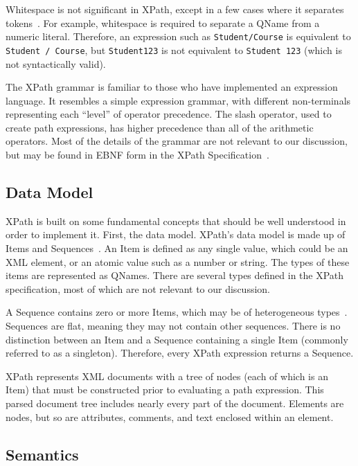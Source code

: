 \documentclass{article}
\begin{document}
Whitespace is not significant in XPath, except in a few cases where it separates
tokens~\cite{xpath}. For example, whitespace is required to separate a QName
from a numeric literal. Therefore, an expression such as \texttt{Student/Course}
is equivalent to \texttt{Student / Course}, but \texttt{Student123} is not
equivalent to \texttt{Student 123} (which is not syntactically valid).

The XPath grammar is familiar to those who have implemented an expression
language. It resembles a simple expression grammar, with different non-terminals
representing each ``level'' of operator precedence. The slash operator, used to
create path expressions, has higher precedence than all of the arithmetic
operators. Most of the details of the grammar are not relevant to our
discussion, but may be found in EBNF form in the XPath
Specification~\cite{xpath}.

\subsection{Data Model}

XPath is built on some fundamental concepts that should be well understood in
order to implement it. First, the data model. XPath's data model is made up of
Items and Sequences~\cite{xpath-datamodel}. An Item is defined as any single
value, which could be an XML element, or an atomic value such as a number or
string. The types of these items are represented as QNames. There are several
types defined in the XPath specification, most of which are not relevant to our
discussion.

A Sequence contains zero or more Items, which may be of heterogeneous
types~\cite{xpath-datamodel}. Sequences are flat, meaning they may not contain
other sequences. There is no distinction between an Item and a Sequence
containing a single Item (commonly referred to as a singleton). Therefore, every
XPath expression returns a Sequence.

XPath represents XML documents with a tree of nodes (each of which is an Item)
that must be constructed prior to evaluating a path expression. This parsed
document tree includes nearly every part of the document. Elements are nodes,
but so are attributes, comments, and text enclosed within an element.

\subsection{Semantics}
\end{document}

